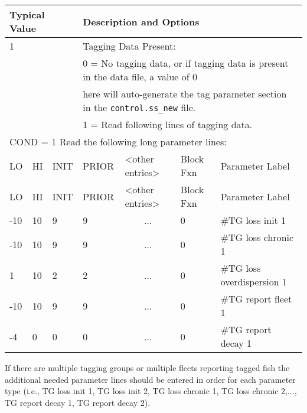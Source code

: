 \begin{longtable}{p{1cm} p{1cm} p{1cm} p{1.5cm} p{2.9cm} p{1.25cm} p{4.25cm}}
	\hline
	\multicolumn{3}{l}{Typical Value} & \multicolumn{4}{l}{Description and Options} \Tstrut\Bstrut\\
	\hline
	\multicolumn{3}{l}{1} & \multicolumn{4}{l}{Tagging Data Present:} \Tstrut\\
	\multicolumn{3}{l}{}  & \multicolumn{4}{l}{0 = No tagging data, or if tagging data is present in the data file, a value of 0} \\
	\multicolumn{3}{l}{}  & \multicolumn{4}{l}{here will auto-generate the tag parameter section in the \texttt{control.ss\_new} file.} \\
	\multicolumn{3}{l}{}  & \multicolumn{4}{l}{1 = Read following lines of tagging data.} \Bstrut\\


	\multicolumn{7}{l}{COND = 1 Read the following long parameter lines:} \Tstrut\\
	\hline
	LO \Tstrut & HI & INIT & PRIOR &  <other entries> & Block Fxn & Parameter Label \Bstrut\\
	\hline
	\endfirsthead

	\hline
	LO \Tstrut & HI & INIT & PRIOR & <other entries> & Block Fxn & Parameter Label \Bstrut\\
	\hline
	\endhead

	\hline
	\endfoot
	\endlastfoot

	-10 & 10 & 9 & 9 & \multicolumn{1}{c}{...} & 0 & \#TG loss init 1 \Tstrut\\
	-10 & 10 & 9 & 9 & \multicolumn{1}{c}{...} & 0 & \#TG loss chronic 1 \\
	  1 & 10 & 2 & 2 & \multicolumn{1}{c}{...} & 0 & \#TG loss overdispersion 1 \\
	-10 & 10 & 9 & 9 & \multicolumn{1}{c}{...} & 0 & \#TG report fleet 1 \\
	 -4 &  0 & 0 & 0 & \multicolumn{1}{c}{...} & 0 & \#TG report decay 1 \Bstrut\\
	 \hline
\end{longtable}

If there are multiple tagging groups or multiple fleets reporting tagged fish the additional needed parameter lines should be entered in order for each parameter type (i.e., TG loss init 1, TG loss init 2, TG loss chronic 1, TG loss chronic 2,..., TG report decay 1, TG report decay 2). 

